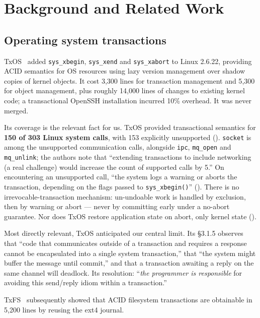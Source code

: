 \documentclass[10pt,twocolumn]{article}
\begin{document}
\section{Background and Related Work}
\label{sec:related}

\subsection{Operating system transactions}

TxOS~\cite{porter2009txos} added \texttt{sys\_xbegin}, \texttt{sys\_xend} and
\texttt{sys\_xabort} to Linux 2.6.22, providing ACID semantics for OS resources
using lazy version management over shadow copies of kernel objects. It cost
3{,}300 lines for transaction management and 5{,}300 for object management, plus
roughly 14{,}000 lines of changes to existing kernel code; a transactional
OpenSSH installation incurred 10\% overhead. It was never merged.

Its coverage is the relevant fact for us. TxOS provided transactional semantics
for \textbf{150 of 303 Linux system calls}, with 153 explicitly unsupported
(\cite[Table~1]{porter2009txos}). \texttt{socket} is among the unsupported
communication calls, alongside \texttt{ipc}, \texttt{mq\_open} and
\texttt{mq\_unlink}; the authors note that ``extending transactions to include
networking (a real challenge) would increase the count of supported calls by
5.'' On encountering an unsupported call, ``the system logs a warning or aborts
the transaction, depending on the flags passed to \texttt{sys\_xbegin()}''
(\cite[\S3.2]{porter2009txos}). There is no irrevocable-transaction mechanism:
un-undoable work is handled by exclusion, then by warning or abort --- never by
committing early under a no-abort guarantee. Nor does TxOS restore application
state on abort, only kernel state (\cite[\S3.1.4]{porter2009txos}).

Most directly relevant, TxOS anticipated our central limit. Its \S3.1.5
observes that ``code that communicates outside of a transaction and requires a
response cannot be encapsulated into a single system transaction,'' that ``the
system might buffer the message until commit,'' and that a transaction awaiting
a reply on the same channel will deadlock. Its resolution: ``\emph{the
programmer is responsible} for avoiding this send/reply idiom within a
transaction.''

TxFS~\cite{hu2018txfs,hu2019txfs} subsequently showed that ACID filesystem
transactions are obtainable in 5{,}200 lines by reusing the ext4 journal.
\end{document}
